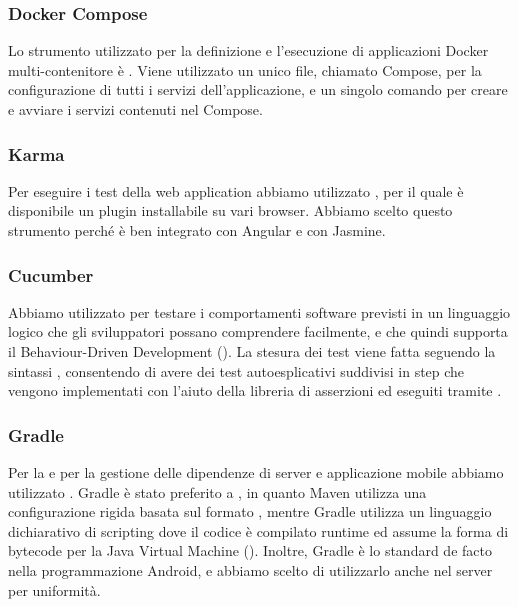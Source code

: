 \documentclass[../../../manuale-manutentore.tex]{subfiles}
\begin{document}
\subsubsection{Docker Compose}%
\label{subs:docker_compose}

Lo strumento utilizzato per la definizione e l'esecuzione di applicazioni Docker multi-contenitore è .
Viene utilizzato un unico file, chiamato Compose, per la configurazione di tutti i servizi dell'applicazione, e un singolo comando per creare e avviare i servizi contenuti nel Compose.



\subsubsection{Karma}%
\label{subs:karma}

Per eseguire i test della web application abbiamo utilizzato , per il quale è disponibile un plugin installabile su vari browser.
Abbiamo scelto questo strumento perché è ben integrato con Angular e con Jasmine.

\subsubsection{Cucumber}%
\label{subs:cucumber}

Abbiamo utilizzato  per testare i comportamenti software previsti in un linguaggio logico che gli sviluppatori possano comprendere facilmente, e che quindi supporta il Behaviour-Driven Development ().
La stesura dei test viene fatta seguendo la sintassi , consentendo di avere dei test autoesplicativi suddivisi in step che vengono implementati con l'aiuto della libreria di asserzioni  ed eseguiti tramite .

\subsubsection{Gradle}%
\label{subs:gradle}

Per la  e per la gestione delle dipendenze di server e applicazione mobile abbiamo utilizzato .
Gradle è stato preferito a , in quanto Maven utilizza una configurazione rigida basata sul formato , mentre Gradle utilizza un linguaggio dichiarativo di scripting  dove il codice è compilato runtime ed assume la forma di bytecode per la Java Virtual Machine ().
Inoltre, Gradle è lo standard de facto nella programmazione Android, e abbiamo scelto di utilizzarlo anche nel server per uniformità.
\end{document}
